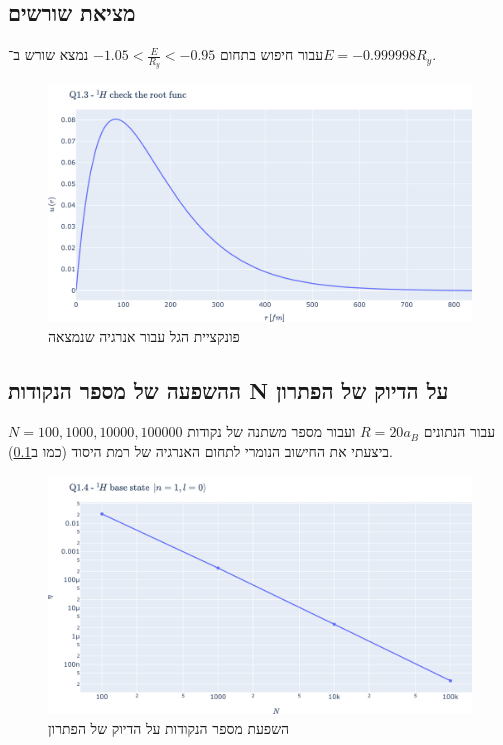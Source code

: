 \documentclass{article}
\begin{document}
\subsection{מציאת שורשים}\label{subsec:1.2}
עבור חיפוש בתחום $-1.05 < \frac{E}{R_y} < -0.95$ נמצא שורש ב־$E = -0.999998 R_y$.
\begin{figure}[h]\label{fig:1.3}
    \centering
    \includegraphics[width=\linewidth]{plots/1.3.pdf}
    \caption{פונקציית הגל עבור אנרגיה שנמצאה}
\end{figure}

\subsection{ההשפעה של מספר הנקודות N על הדיוק של הפתרון}
עבור הנתונים $R=20 a_B $ ועבור מספר משתנה של נקודות $N = 100, 1000, 10000, 100000$ ביצעתי את החישוב הנומרי לתחום האנרגיה של רמת היסוד (כמו ב\ref{subsec:1.2}). 
\begin{figure}[h]\label{fig:1.4}
    \centering
    \includegraphics[width=\linewidth]{plots/1.4.pdf}
    \caption{השפעת מספר הנקודות על הדיוק של הפתרון}
\end{figure}
\end{document}
